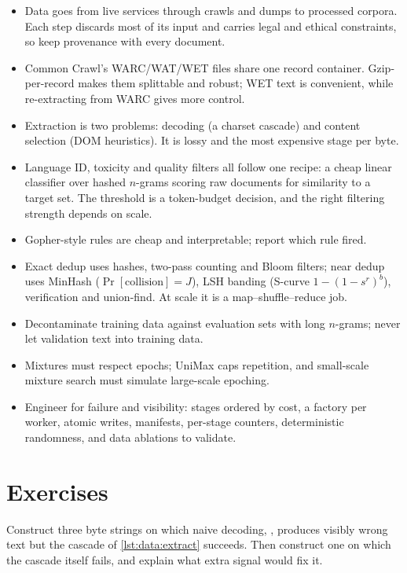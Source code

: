 \begin{itemize}
  \item Data goes from live services through crawls and dumps to processed corpora. Each step
        discards most of its input and carries legal and ethical constraints, so keep provenance with
        every document.
  \item Common Crawl's WARC/WAT/WET files share one record container. Gzip-per-record makes
        them splittable and robust; WET text is convenient, while re-extracting from WARC gives more control.
  \item Extraction is two problems: decoding (a charset cascade) and content selection (DOM
        heuristics). It is lossy and the most expensive stage per byte.
  \item Language ID, toxicity and quality filters all follow one recipe: a cheap linear classifier
        over hashed $n$-grams scoring raw documents for similarity to a target set. The
        threshold is a token-budget decision, and the right filtering strength depends on scale.
  \item Gopher-style rules are cheap and interpretable; report which rule fired.
  \item Exact dedup uses hashes, two-pass counting and Bloom filters; near dedup uses MinHash
        ($\Pr[\text{collision}]=J$), LSH banding (S-curve $1-(1-s^r)^b$), verification and
        union-find. At scale it is a map--shuffle--reduce job.
  \item Decontaminate training data against evaluation sets with long $n$-grams; never let validation text
        into training data.
  \item Mixtures must respect epochs; UniMax caps repetition, and small-scale mixture
        search must simulate large-scale epoching.
  \item Engineer for failure and visibility: stages ordered by cost, a factory per worker, atomic writes,
        manifests, per-stage counters, deterministic randomness, and data ablations to validate.
\end{itemize}

\section{Exercises}\label{sec:data:exercises}

\begin{exercise}
Construct three byte strings on which naive decoding,
, produces visibly wrong text but the cascade of \cref{lst:data:extract} succeeds. Then construct
one on which the cascade itself fails, and explain what extra signal would fix it.
\end{exercise}

